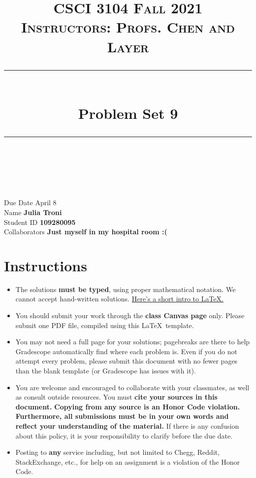 \documentclass[11pt]{article}
\title{
\normalfont \normalsize 
\textsc{CSCI 3104 Fall 2021 \\ 
Instructors: Profs. Chen and Layer} \\
[10pt] 
\rule{\linewidth}{0.5pt} \\[6pt] 
\huge Problem Set 9 \\
\rule{\linewidth}{2pt}  \\[10pt]
}
\date{}
\theoremstyle{definition}
\theoremstyle{definition}
\theoremstyle{definition}
\begin{document}
\maketitle


\noindent
Due Date \dotfill April 8 \\
Name \dotfill \textbf{Julia Troni} \\
Student ID \dotfill \textbf{109280095} \\
Collaborators \dotfill \textbf{Just myself in my hospital room :( }

\tableofcontents

\section{Instructions}
 \begin{itemize}
	\item The solutions \textbf{must be typed}, using proper mathematical notation. We cannot accept hand-written solutions. \href{http://ece.uprm.edu/~caceros/latex/introduction.pdf}{Here's a short intro to \LaTeX.}
	\item You should submit your work through the \textbf{class Canvas page} only. Please submit one PDF file, compiled using this \LaTeX \ template.
	\item You may not need a full page for your solutions; pagebreaks are there to help Gradescope automatically find where each problem is. Even if you do not attempt every problem, please submit this document with no fewer pages than the blank template (or Gradescope has issues with it).

	\item You are welcome and encouraged to collaborate with your classmates, as well as consult outside resources. You must \textbf{cite your sources in this document.} \textbf{Copying from any source is an Honor Code violation. Furthermore, all submissions must be in your own words and reflect your understanding of the material.} If there is any confusion about this policy, it is your responsibility to clarify before the due date. 

	\item Posting to \textbf{any} service including, but not limited to Chegg, Reddit, StackExchange, etc., for help on an assignment is a violation of the Honor Code.
\end{itemize}
\end{document}
